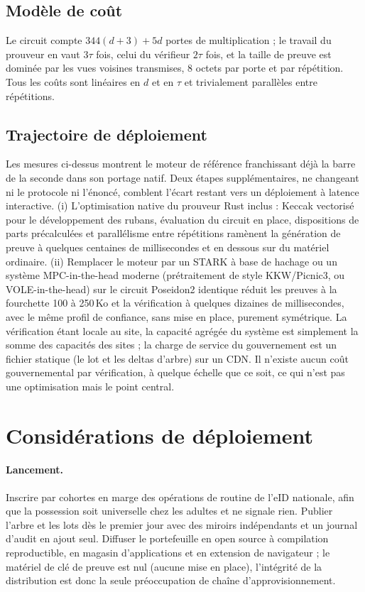 \documentclass[11pt]{article}
\theoremstyle{definition}
\begin{document}
\subsection{Modèle de coût}

Le circuit compte $344(d+3) + 5d$ portes de multiplication ; le travail du prouveur en
vaut $3\tau$ fois, celui du vérifieur $2\tau$ fois, et la taille de preuve est dominée par
les vues voisines transmises, 8 octets par porte et par répétition. Tous les coûts sont
linéaires en $d$ et en $\tau$ et trivialement parallèles entre répétitions.

\subsection{Trajectoire de déploiement}
\label{sec:deploypath}

Les mesures ci-dessus montrent le moteur de référence franchissant déjà la barre de la
seconde dans son portage natif. Deux étapes supplémentaires, ne changeant ni le protocole
ni l'énoncé, comblent l'écart restant vers un déploiement à latence interactive. (i)
L'optimisation native du prouveur Rust inclus : Keccak vectorisé pour le développement des
rubans, évaluation du circuit en place, dispositions de parts précalculées et parallélisme
entre répétitions ramènent la génération de preuve à quelques centaines de millisecondes
et en dessous sur du matériel ordinaire. (ii) Remplacer le moteur par un STARK à base de hachage ou un système MPC-in-the-head
moderne (prétraitement de style KKW/Picnic3, ou VOLE-in-the-head) sur le circuit Poseidon2
identique réduit les preuves à la fourchette 100 à 250\,Ko et la vérification à quelques
dizaines de millisecondes, avec le même profil de confiance, sans mise en place, purement
symétrique. La vérification étant locale au site, la capacité agrégée du système est
simplement la somme des capacités des sites ; la charge de service du gouvernement est un
fichier statique (le lot et les deltas d'arbre) sur un CDN. Il n'existe aucun coût
gouvernemental par vérification, à quelque échelle que ce soit, ce qui n'est pas une
optimisation mais le point central.

\section{Considérations de déploiement}
\label{sec:deploy}

\paragraph{Lancement.} Inscrire par cohortes en marge des opérations de routine de l'eID
nationale, afin que la possession soit universelle chez les adultes et ne signale rien.
Publier l'arbre et les lots dès le premier jour avec des miroirs indépendants et un
journal d'audit en ajout seul. Diffuser le portefeuille en open source à compilation
reproductible, en magasin d'applications et en extension de navigateur ; le matériel de
clé de preuve est nul (aucune mise en place), l'intégrité de la distribution est donc la
seule préoccupation de chaîne d'approvisionnement.
\end{document}
